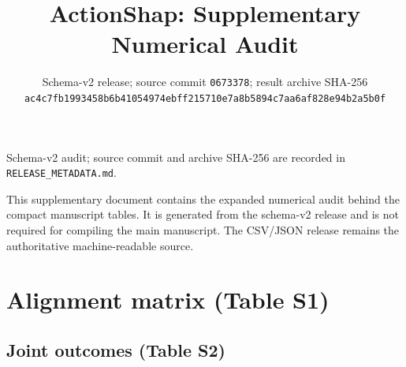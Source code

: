\documentclass[pdflatex,sn-mathphys-num]{sn-jnl}
\begin{document}
\title[ActionShap Supplementary Audit]{ActionShap: Supplementary Numerical Audit}
\subtitle{Schema-v2 release; source commit \texttt{0673378}; result archive SHA-256 \texttt{ac4c7fb1993458b6b41054974ebff215710e7a8b5894c7aa6af828e94b2a5b0f}}
\author*[1]{ }
\author[1]{ }
\author[1]{ }
\date{}
\maketitle
\begin{center}\small Schema-v2 audit; source commit and archive SHA-256 are recorded in \texttt{RELEASE\_METADATA.md}.\end{center}

This supplementary document contains the expanded numerical audit behind the
compact manuscript tables. It is generated from the schema-v2 release and is
not required for compiling the main manuscript. The CSV/JSON release remains
the authoritative machine-readable source.

\appendix
\setcounter{section}{0}
\renewcommand{\thesection}{S\arabic{section}}
\renewcommand{\thetable}{S\arabic{table}}
\section{Alignment matrix (Table S1)}

\clearpage
\begin{landscape}
\section{Joint outcomes (Table S2)}

\end{landscape}
\clearpage
\end{document}
